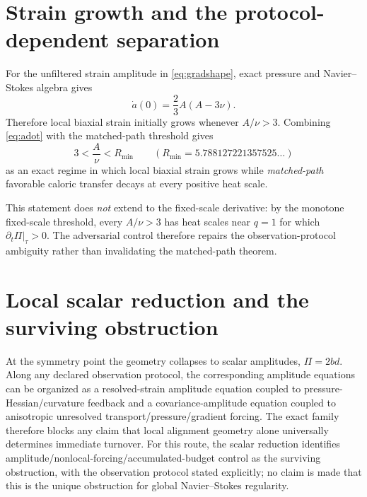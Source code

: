 \documentclass[11pt,a4paper]{article}
\begin{document}
\section{Strain growth and the protocol-dependent separation}
For the unfiltered strain amplitude in \eqref{eq:gradshape}, exact pressure and Navier--Stokes algebra gives
\begin{equation}
 \dot a(0)=\frac23 A(A-3\nu).
 \label{eq:adot}
\end{equation}
Therefore local biaxial strain initially grows whenever $A/\nu>3$. Combining \eqref{eq:adot} with the matched-path threshold gives
\begin{equation}
 \boxed{\displaystyle 3<\frac{A}{\nu}<R_{\min}}\qquad(R_{\min}=5.788127221357525\ldots)
\end{equation}
as an exact regime in which local biaxial strain grows while \emph{matched-path} favorable caloric transfer decays at every positive heat scale.

This statement does \emph{not} extend to the fixed-scale derivative: by the monotone fixed-scale threshold, every $A/\nu>3$ has heat scales near $q=1$ for which $\left.\partial_t\Pi\right|_\tau>0$. The adversarial control therefore repairs the observation-protocol ambiguity rather than invalidating the matched-path theorem.

\section{Local scalar reduction and the surviving obstruction}
At the symmetry point the geometry collapses to scalar amplitudes, $\Pi=2bd$. Along any declared observation protocol, the corresponding amplitude equations can be organized as a resolved-strain amplitude equation coupled to pressure-Hessian/curvature feedback and a covariance-amplitude equation coupled to anisotropic unresolved transport/pressure/gradient forcing. The exact family therefore blocks any claim that local alignment geometry alone universally determines immediate turnover. For this route, the scalar reduction identifies amplitude/nonlocal-forcing/accumulated-budget control as the surviving obstruction, with the observation protocol stated explicitly; no claim is made that this is the unique obstruction for global Navier--Stokes regularity.
\end{document}
